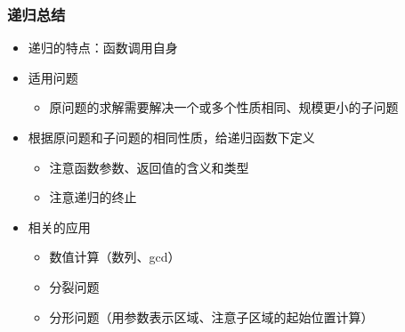 \begin{frame}[fragile]
    \frametitle{递归总结}
    \begin{itemize}
        \item 递归的特点：函数调用自身
        \item 适用问题
        \begin{itemize}
            \item 原问题的求解需要解决一个或多个性质相同、规模更小的子问题
        \end{itemize}
        \item 根据原问题和子问题的相同性质，给递归函数下定义
        \begin{itemize}
            \item 注意函数参数、返回值的含义和类型
            \item 注意递归的终止
        \end{itemize}
        \item 相关的应用
        \begin{itemize}
            \item 数值计算（数列、gcd）
            \item 分裂问题
            \item 分形问题（用参数表示区域、注意子区域的起始位置计算）
        \end{itemize}
    \end{itemize}

\end{frame}

